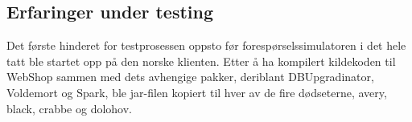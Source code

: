 
\subsection{Erfaringer under testing}

Det første hinderet for testprosessen oppsto før forespørselssimulatoren i det hele tatt ble startet opp på den norske klienten. Etter å ha kompilert kildekoden til WebShop sammen med dets avhengige pakker, deriblant DBUpgradinator, Voldemort og Spark, ble jar-filen kopiert til hver av de fire dødseterne, avery, black, crabbe og dolohov.

